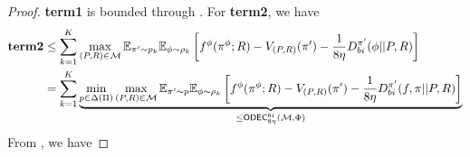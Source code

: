 \begin{proof}
\textbf{term1} is bounded through . For \textbf{term2}, we have
\begin{align*}
\textbf{term2} &\le \sum_{k=1}^K \max_{(P,R) \in \mathcal{M}}\mathbb{E}_{\pi' \sim p_k}\mathbb{E}_{\phi \sim \rho_k}\left[f^{\phi}(\pi^{\phi}; R) - V_{(P,R)}(\pi') - \frac{1}{8\eta} D_{bi}^{\pi'}(\phi||P, R)\right]
    \\&= \sum_{k=1}^K \underbrace{\min_{p \in \Delta(\Pi)}\max_{(P,R) \in \mathcal{M}}\mathbb{E}_{\pi' \sim p}\mathbb{E}_{\phi \sim \rho_k}\left[f^{\phi}(\pi^{\phi}; R) - V_{(P,R)}(\pi')  - \frac{1}{8\eta} D_{bi}^{\pi'}(f, \pi||P, R)\right]}_{\le \mathsf{ODEC}^{bi}_{8\eta}(\mathcal{M}, \Phi)}
\end{align*}
From , we have


\end{proof}
